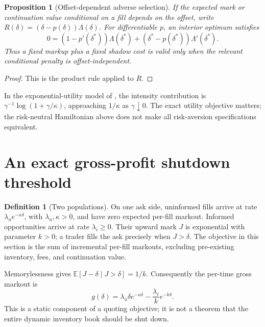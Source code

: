 \documentclass[11pt]{article}
\theoremstyle{plain}
\newtheorem{proposition}[theorem]{Proposition}
\theoremstyle{definition}
\newtheorem{definition}[theorem]{Definition}
\theoremstyle{remark}
\newcommand{\E}{\mathbb E}
\begin{document}
\begin{proposition}[Offset-dependent adverse selection]\label{prop:selection}
If the expected mark or continuation value conditional on a fill depends
on the offset, write \(R(\delta)=(\delta-p(\delta))\Lambda(\delta)\).
For differentiable \(p\), an interior optimum satisfies
\[
0=(1-p'(\delta^\ast))\Lambda(\delta^\ast)
 +(\delta^\ast-p(\delta^\ast))\Lambda'(\delta^\ast).
\]
Thus a fixed markup plus a fixed shadow cost is valid only when the
relevant conditional penalty is offset-independent.
\end{proposition}
\begin{proof}
This is the product rule applied to \(R\).
\end{proof}

In the exponential-utility model of \citet{AvellanedaStoikov2008}, the
intensity contribution is
\(\gamma^{-1}\log(1+\gamma/\kappa)\), approaching \(1/\kappa\) as
\(\gamma\downarrow0\). The exact utility objective matters; the
risk-neutral Hamiltonian above does not make all risk-aversion
specifications equivalent.

\section{An exact gross-profit shutdown threshold}

\begin{definition}[Two populations]\label{def:populations}
On one ask side, uninformed fills arrive at rate
\(\lambda_u e^{-\kappa\delta}\), with \(\lambda_u,\kappa>0\), and have
zero expected per-fill markout. Informed opportunities arrive at rate
\(\lambda_i\ge0\). Their upward mark \(J\) is exponential with parameter
\(k>0\); a trader fills the ask precisely when \(J>\delta\).
The objective in this section is the sum of incremental per-fill
markouts, excluding pre-existing inventory, fees, and continuation value.
\end{definition}

Memorylessness gives
\(\E[J-\delta\mid J>\delta]=1/k\).
Consequently the per-time gross markout is
\begin{equation}\label{eq:shutdownreward}
g(\delta)=\lambda_u\delta e^{-\kappa\delta}
             -\frac{\lambda_i}{k}e^{-k\delta}.
\end{equation}
This is a static component of a quoting objective; it is not a theorem
that the entire dynamic inventory book should be shut down.
\end{document}
